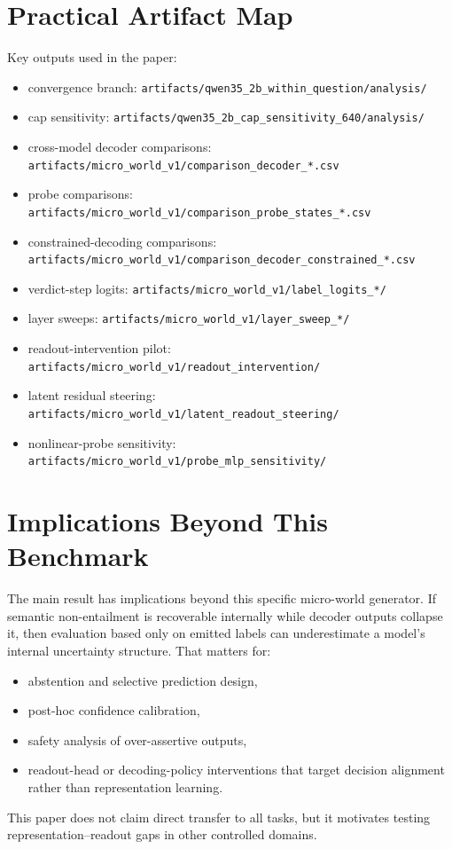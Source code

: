 \documentclass[11pt]{article}
\begin{document}
\section{Practical Artifact Map}
Key outputs used in the paper:
\begin{itemize}
  \item convergence branch: \texttt{artifacts/qwen35\_2b\_within\_question/analysis/}
  \item cap sensitivity: \texttt{artifacts/qwen35\_2b\_cap\_sensitivity\_640/analysis/}
  \item cross-model decoder comparisons: \texttt{artifacts/micro\_world\_v1/comparison\_decoder\_*.csv}
  \item probe comparisons: \texttt{artifacts/micro\_world\_v1/comparison\_probe\_states\_*.csv}
  \item constrained-decoding comparisons: \texttt{artifacts/micro\_world\_v1/comparison\_decoder\_constrained\_*.csv}
  \item verdict-step logits: \texttt{artifacts/micro\_world\_v1/label\_logits\_*/}
  \item layer sweeps: \texttt{artifacts/micro\_world\_v1/layer\_sweep\_*/}
  \item readout-intervention pilot: \texttt{artifacts/micro\_world\_v1/readout\_intervention/}
  \item latent residual steering: \texttt{artifacts/micro\_world\_v1/latent\_readout\_steering/}
  \item nonlinear-probe sensitivity: \texttt{artifacts/micro\_world\_v1/probe\_mlp\_sensitivity/}
\end{itemize}

\section{Implications Beyond This Benchmark}
The main result has implications beyond this specific micro-world generator.
If semantic non-entailment is recoverable internally while decoder outputs collapse it, then evaluation based only on emitted labels can underestimate a model's internal uncertainty structure.
That matters for:
\begin{itemize}
  \item abstention and selective prediction design,
  \item post-hoc confidence calibration,
  \item safety analysis of over-assertive outputs,
  \item readout-head or decoding-policy interventions that target decision alignment rather than representation learning.
\end{itemize}
This paper does not claim direct transfer to all tasks, but it motivates testing representation--readout gaps in other controlled domains.
\end{document}

